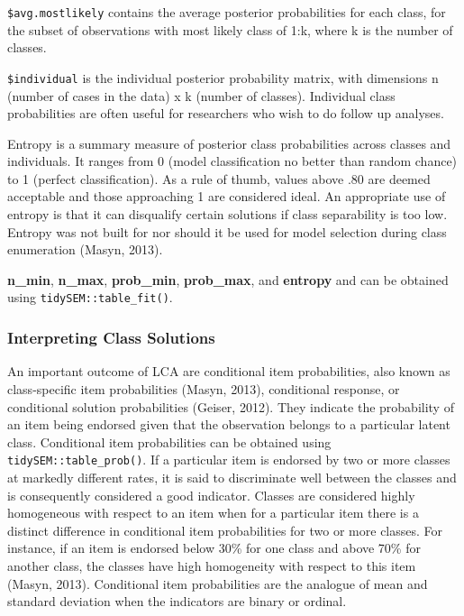 \documentclass[
  ,man,floatsintext]{apa6}
\begin{document}
\texttt{\$avg.mostlikely} contains the average posterior probabilities for each class,
for the subset of observations with most likely class of 1:k,
where k is the number of classes.

\texttt{\$individual} is the individual posterior probability matrix,
with dimensions n (number of cases in the data) x k (number of classes).
Individual class probabilities are often useful for researchers
who wish to do follow up analyses.

Entropy is a summary measure of posterior class probabilities
across classes and individuals.
It ranges from 0 (model classification no better than random chance)
to 1 (perfect classification).
As a rule of thumb, values above .80 are deemed acceptable
and those approaching 1 are considered ideal.
An appropriate use of entropy is that it can disqualify certain solutions
if class separability is too low.
Entropy was not built for nor should it be used for
model selection during class enumeration (Masyn, 2013).

\textbf{n\_min}, \textbf{n\_max}, \textbf{prob\_min}, \textbf{prob\_max}, and \textbf{entropy} and can be obtained using \texttt{tidySEM::table\_fit()}.

\hypertarget{interpreting-class-solutions}{%
\subsubsection{Interpreting Class Solutions}\label{interpreting-class-solutions}}

An important outcome of LCA are conditional item probabilities,
also known as class-specific item probabilities (Masyn, 2013),
conditional response, or conditional solution probabilities (Geiser, 2012).
They indicate the probability of an item being endorsed
given that the observation belongs to a particular latent class.
Conditional item probabilities can be obtained using \texttt{tidySEM::table\_prob()}.
If a particular item is endorsed by two or more classes at markedly different rates,
it is said to discriminate well between the classes
and is consequently considered a good indicator.
Classes are considered highly homogeneous with respect to an item
when for a particular item
there is a distinct difference in conditional item probabilities
for two or more classes.
For instance, if an item is endorsed below 30\% for one class and
above 70\% for another class,
the classes have high homogeneity with respect to this item (Masyn, 2013).
Conditional item probabilities are the analogue of mean and standard deviation
when the indicators are binary or ordinal.
\end{document}
